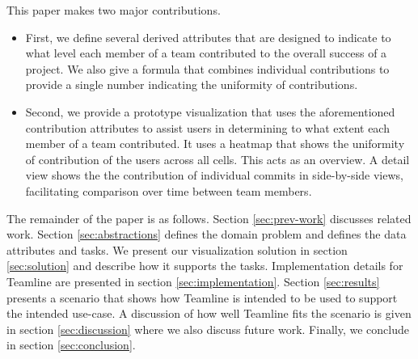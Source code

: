 \documentclass[../manifest.tex]{subfiles}
\begin{document}
This paper makes two major contributions.
\begin{itemize}
  \item First, we define several derived attributes that are designed to indicate to what level each member of a team contributed to the overall success of a project. We also give a formula that combines individual contributions to provide a single number indicating the uniformity of contributions.
  \item Second, we provide a prototype visualization that uses the aforementioned contribution attributes to assist users in determining to what extent each member of a team contributed. It uses a heatmap that shows the uniformity of contribution of the users across all cells. This acts as an overview. A detail view shows the the contribution of individual commits in side-by-side views, facilitating comparison over time between team members.
\end{itemize}

The remainder of the paper is as follows. Section \ref{sec:prev-work} discusses related work. Section \ref{sec:abstractions} defines the domain problem and defines the data attributes and tasks. We present our visualization solution in section \ref{sec:solution} and describe how it supports the tasks. Implementation details for Teamline are presented in section \ref{sec:implementation}. Section \ref{sec:results} presents a scenario that shows how Teamline is intended to be used to support the intended use-case. A discussion of how well Teamline fits the scenario is given in section \ref{sec:discussion} where we also discuss future work. Finally, we conclude in section \ref{sec:conclusion}.
\end{document}
